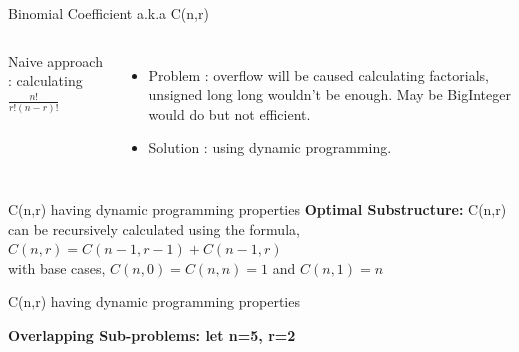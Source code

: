 \documentclass{beamer}
\begin{document}
\begin{frame}{Binomial Coefficient a.k.a C(n,r)}
    \begin{columns}
    Naive approach : calculating $\frac{n!}{r!(n−r)!}$
    \begin{itemize}
        \item Problem : overflow will be caused calculating factorials, unsigned long long wouldn’t be enough. May be BigInteger would do but not efficient.
\item Solution : using dynamic programming.
    \end{itemize}
    \end{columns}
\end{frame}
\begin{frame}{C(n,r) having dynamic programming properties}
\textbf{Optimal Substructure:} C(n,r) can be recursively calculated using the formula,\\
$C (n,r ) = C (n −1,r −1) + C (n −1,r )$\\
with base cases, $C (n,0) = C (n,n) = 1$ and $C (n,1) = n$
\end{frame}
\begin{frame}{C(n,r) having dynamic programming properties}
\begin{center}
    \textbf{Overlapping Sub-problems: let n=5, r=2}
\end{center}
\end{frame}
\end{document}
